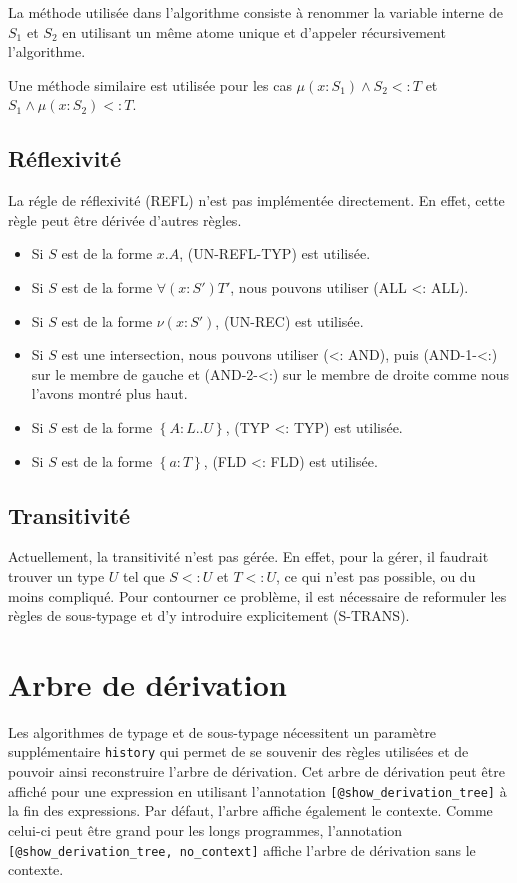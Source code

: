 La méthode utilisée dans l'algorithme consiste à renommer la variable interne de
$S_{1}$ et $S_{2}$ en utilisant un même atome unique et d'appeler récursivement l'algorithme.

Une méthode similaire est utilisée pour les cas $\mu(x : S_{1}) \wedge S_{2} <:
T$ et $S_{1} \wedge \mu(x : S_{2}) <: T$.

\subsection*{Réflexivité}

La régle de réflexivité (REFL) n'est pas implémentée directement. En effet,
cette règle peut être dérivée d'autres règles.

\begin{itemize}
  \item Si $S$ est de la forme $x.A$, (UN-REFL-TYP) est utilisée.
  \item Si $S$ est de la forme $\forall(x : S') T'$, nous pouvons utiliser (ALL
    <: ALL).
  \item Si $S$ est de la forme $\nu(x : S')$, (UN-REC) est utilisée.
  \item Si $S$ est une intersection, nous pouvons utiliser (<: AND), puis
    (AND-1-<:) sur le membre de gauche et (AND-2-<:) sur le membre de droite
    comme nous l'avons montré plus haut.
  \item Si $S$ est de la forme $\left\{ A : L .. U \right\}$, (TYP <: TYP) est utilisée.
  \item Si $S$ est de la forme $\left\{ a : T \right\}$, (FLD <: FLD) est utilisée.
\end{itemize}

\subsection*{Transitivité}

Actuellement, la transitivité n'est pas gérée. En effet, pour la gérer, il
faudrait trouver un type $U$ tel que $S <: U$ et $T <: U$, ce qui n'est pas
possible, ou du moins compliqué. Pour contourner ce problème, il est
nécessaire de reformuler les règles de sous-typage et d'y introduire
explicitement (S-TRANS).

\section{Arbre de dérivation}

Les algorithmes de typage et de sous-typage nécessitent un paramètre
supplémentaire \verb|history| qui permet de se souvenir des règles
utilisées et de pouvoir ainsi reconstruire l'arbre de dérivation. Cet arbre de
dérivation peut être affiché pour une expression en utilisant l'annotation
\verb|[@show_derivation_tree]| à la fin des expressions. Par défaut, l'arbre
affiche également le contexte. Comme celui-ci peut être grand pour les
longs programmes, l'annotation \\ \verb|[@show_derivation_tree, no_context]|
affiche l'arbre de dérivation sans le contexte.

